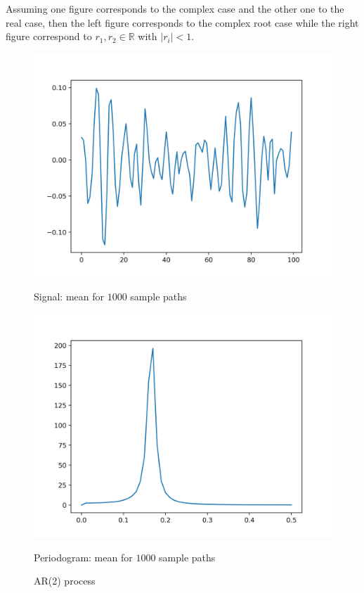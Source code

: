 \documentclass[11pt]{article}
\begin{document}
\begin{solution}
Assuming one figure corresponds to the complex case and the other one to the real case, then the left figure corresponds to the complex root case while the right figure correspond to $r_1, r_2\in\mathbb{R}$ with $|r_i|<1$.
\begin{figure}
    \centering
    \begin{minipage}[t]{0.45\textwidth}
    \centerline{\includegraphics[width=\textwidth]{images/mean_ar_process.png}}
    \centerline{Signal: mean for $1000$ sample paths}
    \end{minipage}
    \hfill
    \begin{minipage}[t]{0.45\textwidth}    \centerline{\includegraphics[width=\textwidth]{images/mean_ar_periodogram.png}}
    \centerline{Periodogram: mean for $1000$ sample paths}
    \end{minipage}
    \caption{AR(2) process}\label{fig:q-ar-2}
\end{figure}


\end{solution}
\end{document}
